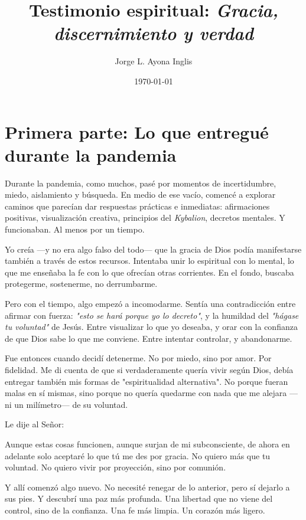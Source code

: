 \documentclass[12pt,a4paper]{article}
\title{Testimonio espiritual: \emph{Gracia, discernimiento y verdad}}
\author{Jorge L. Ayona Inglis}
\date{\today}
\begin{document}
	
	\maketitle
	
	\section*{Primera parte: Lo que entregué durante la pandemia}
	
	Durante la pandemia, como muchos, pasé por momentos de incertidumbre, miedo, aislamiento y búsqueda. En medio de ese vacío, comencé a explorar caminos que parecían dar respuestas prácticas e inmediatas: afirmaciones positivas, visualización creativa, principios del \emph{Kybalion}, decretos mentales.
	Y funcionaban. Al menos por un tiempo.
	
	Yo creía —y no era algo falso del todo— que la gracia de Dios podía manifestarse también a través de estos recursos. Intentaba unir lo espiritual con lo mental, lo que me enseñaba la fe con lo que ofrecían otras corrientes. En el fondo, buscaba protegerme, sostenerme, no derrumbarme.
	
	Pero con el tiempo, algo empezó a incomodarme. Sentía una contradicción entre afirmar con fuerza: \emph{"esto se hará porque yo lo decreto"}, y la humildad del \emph{"hágase tu voluntad"} de Jesús. Entre visualizar lo que yo deseaba, y orar con la confianza de que Dios sabe lo que me conviene. Entre intentar controlar, y abandonarme.
	
	Fue entonces cuando decidí detenerme. No por miedo, sino por amor. Por fidelidad. Me di cuenta de que si verdaderamente quería vivir según Dios, debía entregar también mis formas de "espiritualidad alternativa". No porque fueran malas en sí mismas, sino porque no quería quedarme con nada que me alejara —ni un milímetro— de su voluntad.
	
	Le dije al Señor:
	\begin{displayquote}
		Aunque estas cosas funcionen, aunque surjan de mi subconsciente, de ahora en adelante solo aceptaré lo que tú me des por gracia. No quiero más que tu voluntad. No quiero vivir por proyección, sino por comunión.
	\end{displayquote}
	
	Y allí comenzó algo nuevo. No necesité renegar de lo anterior, pero sí dejarlo a sus pies. Y descubrí una paz más profunda. Una libertad que no viene del control, sino de la confianza. Una fe más limpia. Un corazón más ligero.
	
\end{document}
